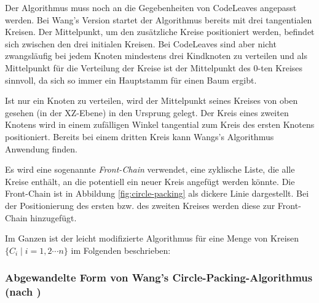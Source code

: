 Der Algorithmus muss noch an die Gegebenheiten von CodeLeaves angepasst werden. Bei Wang's Version startet der Algorithmus bereits mit drei tangentialen Kreisen. Der Mittelpunkt, um den zusätzliche Kreise positioniert werden, befindet sich zwischen den drei initialen Kreisen. Bei CodeLeaves sind aber nicht zwangsläufig bei jedem Knoten mindestens drei Kindknoten zu verteilen und als Mittelpunkt für die Verteilung der Kreise ist der Mittelpunkt des $0$-ten Kreises sinnvoll, da sich so immer ein Hauptstamm für einen Baum ergibt.

Ist nur ein Knoten zu verteilen, wird der Mittelpunkt seines Kreises von oben gesehen (in der XZ-Ebene) in den Ursprung gelegt. Der Kreis eines zweiten Knotens wird in einem zufälligen Winkel tangential zum Kreis des ersten Knotens positioniert. Bereits bei einem dritten Kreis kann Wangs's Algorithmus Anwendung finden.

Es wird eine sogenannte \textit{Front-Chain} verwendet, eine zyklische Liste, die alle Kreise enthält, an die potentiell ein neuer Kreis angefügt werden könnte. Die Front-Chain ist in Abbildung \ref{fig:circle-packing} als dickere Linie dargestellt. Bei der Positionierung des ersten bzw. des zweiten Kreises werden diese zur Front-Chain hinzugefügt. 

Im Ganzen ist der leicht modifizierte Algorithmus für eine Menge von Kreisen $\lbrace C_i \mid i = 1, 2 \cdots n \rbrace$ im Folgenden beschrieben:

\subsubsection*{Abgewandelte Form von Wang's Circle-Packing-Algorithmus (nach \cite{wang2006visualization})}

